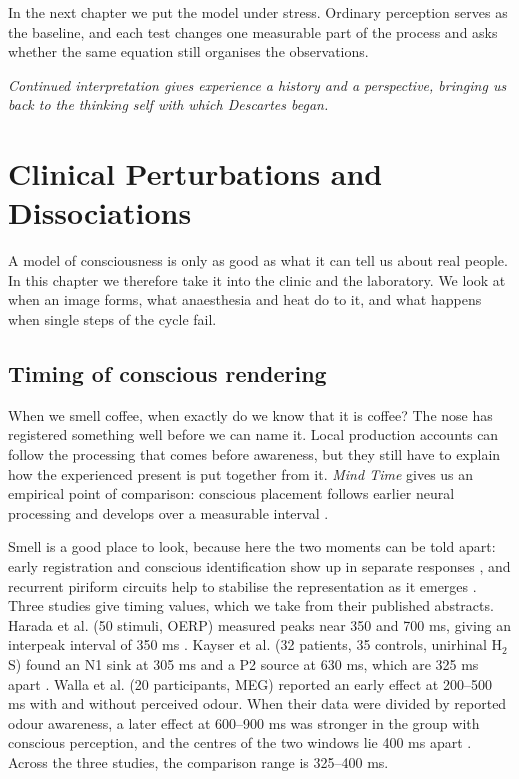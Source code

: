 In the next chapter we put the model under stress. Ordinary perception serves as the
baseline, and each test changes one measurable part of the process and asks whether the
same equation still organises the observations.

\emph{Continued interpretation gives experience a history and a perspective,
bringing us back to the thinking self with which Descartes began.}

\section{Clinical Perturbations and Dissociations}
\label{sec:applications}

A model of consciousness is only as good as what it can tell us about real people. In
this chapter we therefore take it into the clinic and the laboratory. We look at when
an image forms, what anaesthesia and heat do to it, and what happens when single steps
of the cycle fail.

\subsection{Timing of conscious rendering}

When we smell coffee, when exactly do we know that it is coffee? The nose has
registered something well before we can name it. Local production accounts can follow
the processing that comes before awareness, but they still have to explain how the
experienced present is put together from it. \emph{Mind Time} gives us an empirical
point of comparison: conscious placement follows earlier neural processing and
develops over a measurable interval \citep{libet2004}.

Smell is a good place to look, because here the two moments can be told apart: early registration and
conscious identification show up in separate responses \citep{arpaia2022}, and
recurrent piriform circuits help to stabilise the representation as it emerges
\citep{bolding2020}. Three studies give timing values, which we take from their
published abstracts. Harada et al. (50 stimuli, OERP) measured peaks near 350 and
700 ms, giving an interpeak interval of 350 ms \citep{harada2003}. Kayser et al. (32
patients, 35 controls, unirhinal H$_2$S) found an N1 sink at 305 ms and a P2 source
at 630 ms, which are 325 ms apart \citep{kayser2010}. Walla et al. (20 participants,
MEG) reported an early effect at 200--500 ms with and without perceived odour. When
their data were divided by reported odour awareness, a later effect at 600--900 ms
was stronger in the group with conscious perception, and the centres of the two
windows lie 400 ms apart \citep{walla2002}. Across the three studies, the comparison
range is 325--400 ms.

